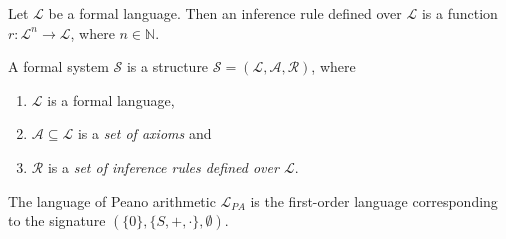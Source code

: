 \begin{definition}
    Let $\mathcal{L}$ be a formal language. Then an inference rule defined over $\mathcal{L}$ is a function $r : \mathcal{L}^n \to \mathcal{L}$, where $n \in \mathbb{N}$.
\end{definition}

\begin{definition}
    A formal system $\mathcal{S}$ is a structure $\mathcal{S} = (\mathcal{L}, \mathcal{A}, \mathcal{R})$, where 
    \begin{enumerate}
        \item $\mathcal{L}$ is a formal language,
        \item $\mathcal{A} \subseteq \mathcal{L}$ is a \textit{set of axioms} and 
        \item $\mathcal{R}$ is a \textit{set of inference rules defined over $\mathcal{L}$}.
    \end{enumerate}
\end{definition}

\begin{definition}
    The language of Peano arithmetic $\mathcal{L}_{PA}$ is the first-order language corresponding to the signature $(\{0\},\{S,+,\cdot\},\emptyset)$.
\end{definition}

